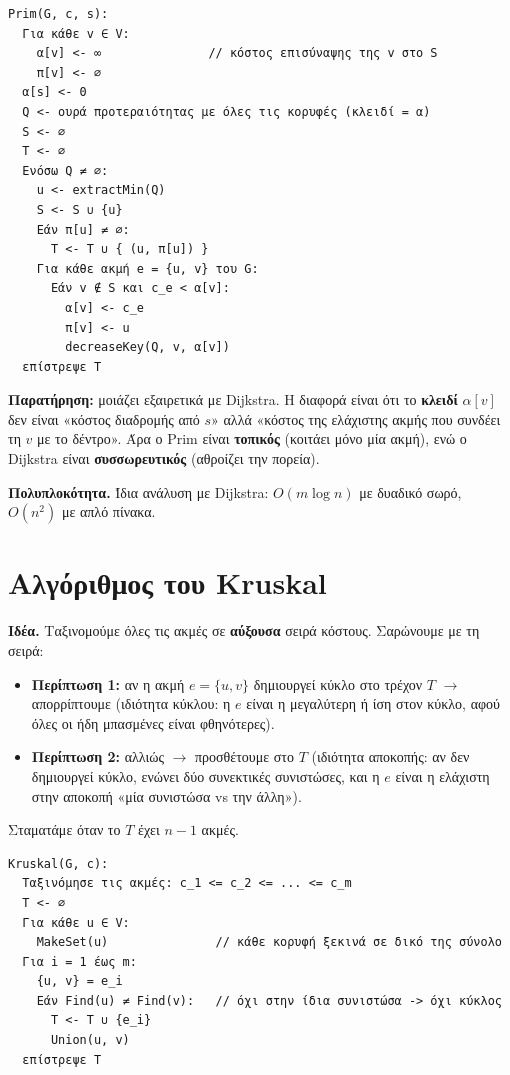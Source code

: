 \documentclass[11pt,a4paper]{article}
\begin{document}
\begin{codebox}
\begin{verbatim}
Prim(G, c, s):
  Για κάθε v ∈ V:
    α[v] <- ∞               // κόστος επισύναψης της v στο S
    π[v] <- ∅
  α[s] <- 0
  Q <- ουρά προτεραιότητας με όλες τις κορυφές (κλειδί = α)
  S <- ∅
  T <- ∅
  Ενόσω Q ≠ ∅:
    u <- extractMin(Q)
    S <- S ∪ {u}
    Εάν π[u] ≠ ∅:
      T <- T ∪ { (u, π[u]) }
    Για κάθε ακμή e = {u, v} του G:
      Εάν v ∉ S και c_e < α[v]:
        α[v] <- c_e
        π[v] <- u
        decreaseKey(Q, v, α[v])
  επίστρεψε T
\end{verbatim}
\end{codebox}

\textbf{Παρατήρηση:} μοιάζει εξαιρετικά με Dijkstra. Η διαφορά είναι ότι το
\textbf{κλειδί} $\alpha[v]$ δεν είναι «κόστος διαδρομής από $s$» αλλά «κόστος της
ελάχιστης ακμής που συνδέει τη $v$ με το δέντρο». Άρα ο Prim είναι
\textbf{τοπικός} (κοιτάει μόνο μία ακμή), ενώ ο Dijkstra είναι
\textbf{συσσωρευτικός} (αθροίζει την πορεία).

\textbf{Πολυπλοκότητα.} Ίδια ανάλυση με Dijkstra: $O(m \log n)$ με δυαδικό σωρό,
$O(n^2)$ με απλό πίνακα.

\section{Αλγόριθμος του Kruskal}

\textbf{Ιδέα.} Ταξινομούμε όλες τις ακμές σε \textbf{αύξουσα} σειρά κόστους.
Σαρώνουμε με τη σειρά:
\begin{itemize}
  \item \textbf{Περίπτωση 1:} αν η ακμή $e = \{u, v\}$ δημιουργεί κύκλο στο
  τρέχον $T$ $\to$ απορρίπτουμε (ιδιότητα κύκλου: η $e$ είναι η μεγαλύτερη ή ίση
  στον κύκλο, αφού όλες οι ήδη μπασμένες είναι φθηνότερες).
  \item \textbf{Περίπτωση 2:} αλλιώς $\to$ προσθέτουμε στο $T$ (ιδιότητα
  αποκοπής: αν δεν δημιουργεί κύκλο, ενώνει δύο συνεκτικές συνιστώσες, και η $e$
  είναι η ελάχιστη στην αποκοπή «μία συνιστώσα vs την άλλη»).
\end{itemize}
Σταματάμε όταν το $T$ έχει $n - 1$ ακμές.

\begin{codebox}
\begin{verbatim}
Kruskal(G, c):
  Ταξινόμησε τις ακμές: c_1 <= c_2 <= ... <= c_m
  T <- ∅
  Για κάθε u ∈ V:
    MakeSet(u)               // κάθε κορυφή ξεκινά σε δικό της σύνολο
  Για i = 1 έως m:
    {u, v} = e_i
    Εάν Find(u) ≠ Find(v):   // όχι στην ίδια συνιστώσα -> όχι κύκλος
      T <- T ∪ {e_i}
      Union(u, v)
  επίστρεψε T
\end{verbatim}
\end{codebox}
\end{document}

